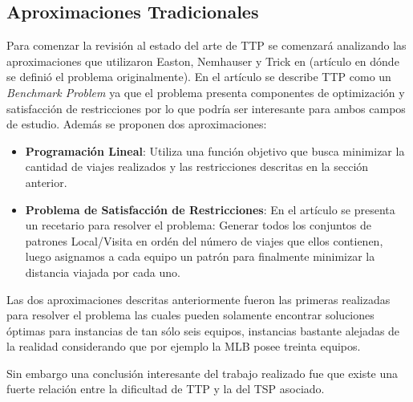 \documentclass[letter, 10pt]{article}
\begin{document}
\subsection{Aproximaciones Tradicionales}
    Para comenzar la revisión al estado del arte de TTP se comenzará analizando las aproximaciones que utilizaron Easton, Nemhauser y Trick en \cite{Description} (artículo en dónde se definió el problema originalmente). En el artículo se describe TTP como un \emph{Benchmark Problem} ya que el problema presenta componentes de optimización y satisfacción de restricciones por lo que podría ser interesante para ambos campos de estudio. Además se proponen dos aproximaciones:
\begin{itemize}
    \item \textbf{Programación Lineal}: Utiliza una función objetivo que busca minimizar la cantidad de viajes realizados y las restricciones descritas en la sección anterior.
    \item \textbf{Problema de Satisfacción de Restricciones}: En el artículo se presenta un recetario para resolver el problema: Generar todos los conjuntos de patrones Local/Visita en ordén del número de viajes que ellos contienen, luego asignamos a cada equipo un patrón para finalmente minimizar la distancia viajada por cada uno.
\end{itemize}
    Las dos aproximaciones descritas anteriormente fueron las primeras realizadas para resolver el problema las cuales pueden solamente encontrar soluciones óptimas para instancias de tan sólo seis equipos, instancias bastante alejadas de la realidad considerando que por ejemplo la MLB posee treinta equipos. 
    
    Sin embargo una conclusión interesante del trabajo realizado fue que existe una fuerte relación entre la dificultad de TTP y la del TSP asociado.
    
\end{document}
